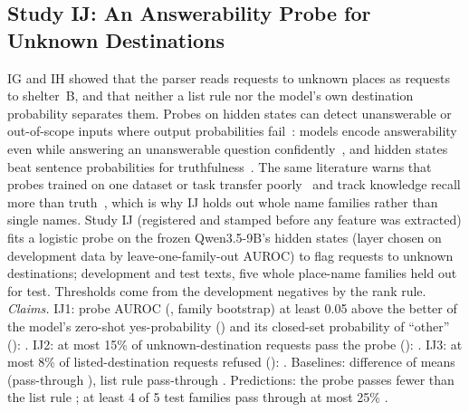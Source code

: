 \subsection{Study IJ: An Answerability Probe for Unknown Destinations}\label{sec:moved-ij}
IG and IH showed that the parser reads requests to unknown places as requests to shelter~B, and that neither a list rule nor the model's own destination probability separates them. Probes on hidden states can detect unanswerable or out-of-scope inputs where output probabilities fail~\cite{wagner2026twoaxes,lavi2025linear}: models encode answerability even while answering an unanswerable question confidently~\cite{slobodkin2023unanswerability}, and hidden states beat sentence probabilities for truthfulness~\cite{azaria2023lying,marks2023geometry}. The same literature warns that probes trained on one dataset or task transfer poorly~\cite{orgad2025knowmore,azizian2025orthogonal} and track knowledge recall more than truth~\cite{cheang2025recall}, which is why IJ holds out whole name families rather than single names. Study IJ (registered and stamped before any feature was extracted) fits a logistic probe on the frozen Qwen3.5-9B's hidden states (layer \IJLayer{} chosen on development data by leave-one-family-out AUROC) to flag requests to unknown destinations; \IJDev{} development and \IJTest{} test texts, five whole place-name families held out for test. Thresholds come from the development negatives by the rank rule.
\emph{Claims.} IJ1: probe AUROC \IJProbeAuroc{} (\IJProbeAurocCI, family bootstrap) at least 0.05 above the better of the model's zero-shot yes-probability (\IJZeroShotAuroc) and its closed-set probability of ``other'' (\IJPOtherAuroc): \IJOneHolds. IJ2: at most 15\% of unknown-destination requests pass the probe (\IJProbePass): \IJTwoHolds. IJ3: at most 8\% of listed-destination requests refused (\IJProbeFalseRef): \IJThreeHolds. Baselines: difference of means \IJDiffMeansAuroc{} (pass-through \IJDiffMeansPass), list rule pass-through \IJListRulePass. Predictions: the probe passes fewer than the list rule \IJPredOneHolds; at least 4 of 5 test families pass through at most 25\% \IJPredTwoHolds.
